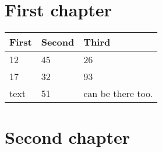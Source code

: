 \documentclass{report}
\newcounter{figCount}%
\newcommand{\addFigure}[3][\Alph{figCount}]{%
    \parbox{#2\textwidth}{\centering #1 \\ \texttt{[image: \#3]}}
    \stepcounter{figCount}
    }
\newenvironment{multiFigure}%
    {%
        \setcounter{figCount}{1}
        \minipage\textwidth
    }
    {%
        \endminipage
    }
\newif\ifdocBody
\begin{document}
\tableofcontents

\listoftables
\listoffigures

\docBodytrue
\chapter{First chapter}

    \label{first}
    \begin{tabularx}{6.5in}{XXX}
      \hline
      First & Second & Third \\
      \hline
      12 & 45 & 26 \\
      17 & 32 & 93 \\
      text & 51 & can be there too. \\	
      \hline
    \end{tabularx}
 
 
 
\chapter{Second chapter}
\begin{multiFigure}
\end{multiFigure}
\end{document}
